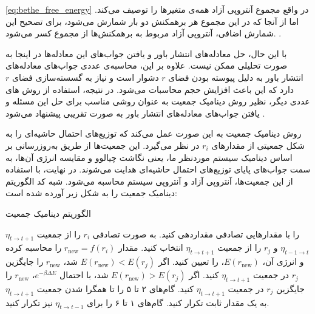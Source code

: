 \autoref{eq:bethe_free_energy}
در واقع مجموع آنتروپی آزاد همه‌ی متغیرها را توصیف می‌کند.
اما از آنجا که در این مجموع هر برهمکنش دو بار شمارش می‌شود، برای تصحیح این شمارش اضافی، آنتروپی آزاد مربوط به برهمکنش‌ها از مجموع کسر می‌شود.
\cite{mezard2003}.

با این حال، حل معادله‌های انتشار باور و یافتن جواب‌های این معادله‌ها در اینجا به صورت تحلیلی ممکن نیست.
علاوه بر این، محاسبه‌ی عددی جواب‌های معادله‌های انتشار باور به دلیل پیوسته بودن فضای
\( r \)
دشوار است و نیاز به گسسته‌سازی فضای
\( r \)
دارد که این باعث افزایش حجم محاسبات می‌شود.
در نتیجه، استفاده از روش های عددی دیگر، نظیر روش دینامیک جمعیت به عنوان روشی مناسب برای حل این مسئله و یافتن جواب‌های معادله‌های انتشار باور به صورت تقریبی پیشنهاد می‌شود
\cite{mezard2001}.

روش دینامیک جمعیت به این صورت عمل می‌کند که توزیع‌های احتمال حاشیه‌ای را به شکل جمعیتی از مقدار‌های
\( r_{i} \)
در نظر می‌گیرد.
این جمعیت‌ها از طریق به‌روزرسانی بر اساس دینامیک سیستم موردنظر ما، یعنی نگاشت چیالوو و مقایسه انرژی آن‌ها، به سمت جواب‌های پایای توزیع‌های احتمال حاشیه‌ای هدایت می‌شوند.
در نهایت، با استفاده از این جمعیت‌ها، آنتروپی آزاد و آنتروپی سیستم محاسبه می‌شود.
شبه کد الگوریتم دینامیک جمعیت را به شکل زیر آورده شده است:
\begin{algorithm}[H]
    \caption{الگوریتم دینامیک جمعیت}
    \begin{algorithmic}[1]
        \STATE \( \eta_{t \to t+1} \)
        را با مقدار‌هایی تصادفی مقداردهی کنید.
        \STATE به صورت تصادفی
        \( r_{i} \)
        را از جمعیت
        \( \eta_{t-1 \to t} \) و \( r_{j} \)
        را از جمعیت
        \( \eta_{t \to t+1} \)
        انتخاب کنید.
        \STATE مقدار
        \( r_{\text{new}} = f(r_{i}) \)
        را محاسبه کرده و انرژی آن،
        \( E(r_{\text{new}}) \)،
        را تعیین کنید.
        \STATE اگر
        \( E(r_{\text{new}}) < E(r_{j}) \)
        شد،
        \( r_{\text{new}} \)
        را جایگزین
        \( r_{j} \)
        در جمعیت
        \( \eta_{t \to t+1} \)
        کنید.
        \STATE اگر
        \( E(r_{\text{new}}) > E(r_{j}) \)
        شد، با احتمال
        \( e^{-\beta \Delta E} \)، \( r_{\text{new}} \)
        را جایگزین
        \( r_{j} \)
        در جمعیت
        \( \eta_{t \to t+1} \)
        کنید.
        \STATE گام‌های ۲ تا ۵ را تا همگرا شدن جمعیت‌
        \( \eta_{t \to t+1} \)
        به یک مقدار ثابت تکرار کنید.
        \STATE گام‌های ۱ تا ۶ را برای
        \( \eta_{t \to t-1} \)
        نیز تکرار کنید.
    \end{algorithmic}
\end{algorithm}

